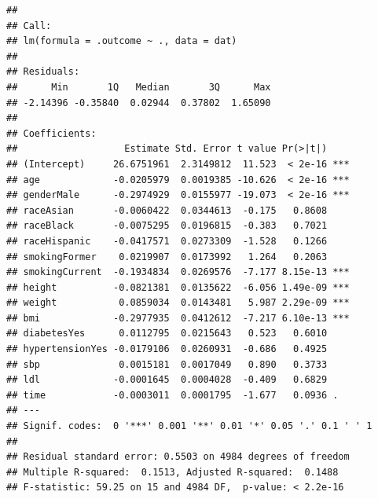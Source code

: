 \documentclass[
]{article}
\newenvironment{Shaded}{\begin{snugshade}}{\end{snugshade}}
\newcommand{\AttributeTok}[1]{\textcolor[rgb]{0.13,0.29,0.53}{#1}}
\newcommand{\CommentTok}[1]{\textcolor[rgb]{0.56,0.35,0.01}{\textit{#1}}}
\newcommand{\DecValTok}[1]{\textcolor[rgb]{0.00,0.00,0.81}{#1}}
\newcommand{\FunctionTok}[1]{\textcolor[rgb]{0.13,0.29,0.53}{\textbf{#1}}}
\newcommand{\NormalTok}[1]{#1}
\newcommand{\OtherTok}[1]{\textcolor[rgb]{0.56,0.35,0.01}{#1}}
\newcommand{\SpecialCharTok}[1]{\textcolor[rgb]{0.81,0.36,0.00}{\textbf{#1}}}
\newcommand{\StringTok}[1]{\textcolor[rgb]{0.31,0.60,0.02}{#1}}
\begin{document}
\begin{Shaded}
\end{Shaded}

\begin{verbatim}
## 
## Call:
## lm(formula = .outcome ~ ., data = dat)
## 
## Residuals:
##      Min       1Q   Median       3Q      Max 
## -2.14396 -0.35840  0.02944  0.37802  1.65090 
## 
## Coefficients:
##                   Estimate Std. Error t value Pr(>|t|)    
## (Intercept)     26.6751961  2.3149812  11.523  < 2e-16 ***
## age             -0.0205979  0.0019385 -10.626  < 2e-16 ***
## genderMale      -0.2974929  0.0155977 -19.073  < 2e-16 ***
## raceAsian       -0.0060422  0.0344613  -0.175   0.8608    
## raceBlack       -0.0075295  0.0196815  -0.383   0.7021    
## raceHispanic    -0.0417571  0.0273309  -1.528   0.1266    
## smokingFormer    0.0219907  0.0173992   1.264   0.2063    
## smokingCurrent  -0.1934834  0.0269576  -7.177 8.15e-13 ***
## height          -0.0821381  0.0135622  -6.056 1.49e-09 ***
## weight           0.0859034  0.0143481   5.987 2.29e-09 ***
## bmi             -0.2977935  0.0412612  -7.217 6.10e-13 ***
## diabetesYes      0.0112795  0.0215643   0.523   0.6010    
## hypertensionYes -0.0179106  0.0260931  -0.686   0.4925    
## sbp              0.0015181  0.0017049   0.890   0.3733    
## ldl             -0.0001645  0.0004028  -0.409   0.6829    
## time            -0.0003011  0.0001795  -1.677   0.0936 .  
## ---
## Signif. codes:  0 '***' 0.001 '**' 0.01 '*' 0.05 '.' 0.1 ' ' 1
## 
## Residual standard error: 0.5503 on 4984 degrees of freedom
## Multiple R-squared:  0.1513, Adjusted R-squared:  0.1488 
## F-statistic: 59.25 on 15 and 4984 DF,  p-value: < 2.2e-16
\end{verbatim}
\end{document}
